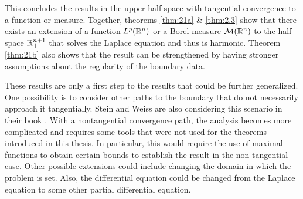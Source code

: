 This concludes the results in the upper half space with tangential convergence to a function or measure. Together, theorems \ref{thm:21a} \& \ref{thm:2.3} show that there exists an extension of a function $L^p(\mathbb R^n)$ or a Borel measure $\mathcal M(\mathbb R^n)$ to the half-space $\mathbb R^{n+1}_+$ that solves the Laplace equation and thus is harmonic. Theorem \ref{thm:21b} also shows that the result can be strengthened by having stronger assumptions about the regularity of the boundary data.

These results are only a first step to the results that could be further generalized. One possibility is to consider other paths to the boundary that do not necessarily approach it tangentially. Stein and Weiss are also considering this scenario in their book \cite{stein_weiss}. With a nontangential convergence path, the analysis becomes more complicated and requires some tools that were not used for the theorems introduced in this thesis. In particular, this would require the use of maximal functions to obtain certain bounds to establish the result in the non-tangential case. Other possible extensions could include changing the domain in which the problem is set. Also, the differential equation could be changed from the Laplace equation to some other partial differential equation.